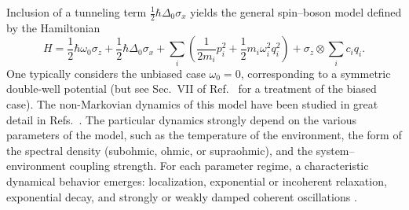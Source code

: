 \documentclass[3p,sort&compress,12pt]{elsarticle}
\begin{document}
Inclusion of a tunneling term $\frac{1}{2} \hbar\Delta_0 \sigma_x$ yields the general spin--boson model defined by the
Hamiltonian
%
\begin{equation}\label{eq:h-sbhdcskgsf}
H = \frac{1}{2} \hbar\omega_0 \sigma_z + 
\frac{1}{2} \hbar\Delta_0 \sigma_x 
+  \sum_i \left( \frac{1}{2m_i} p_i^2 + \frac{1}{2} m_i \omega_i^2 q_i^2 
   \right) + \sigma_z \otimes \sum_i
  c_i q_i.
\end{equation}
%
One typically considers the unbiased case $\omega_0=0$, corresponding to a symmetric double-well potential (but see Sec.~VII of Ref.~\cite{Leggett:1987:pm} for a treatment of the biased case). The non-Markovian dynamics of this model have been studied in great detail in Refs.~\cite{Leggett:1987:pm,Weiss:1999:tv}. The particular dynamics strongly depend on the various parameters of the model, such as the temperature of the environment, the form of the spectral density (subohmic, ohmic, or supraohmic), and the system--environment coupling strength. For each parameter regime, a characteristic dynamical behavior emerges: localization, exponential or incoherent relaxation, exponential decay, and strongly or weakly damped coherent oscillations \cite{Leggett:1987:pm}.
\end{document}
